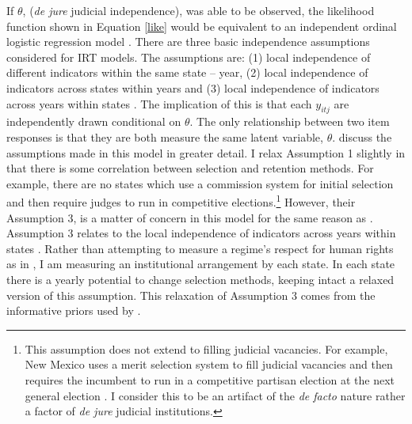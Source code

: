 \documentclass[12pt]{article}
\begin{document}
If $\theta$, (\textit{de jure} judicial independence), was able to be observed, the likelihood function shown in Equation \ref{like} would be equivalent to an independent ordinal logistic regression model \citep[8]{Schnakenberg2014}.  There are three basic independence assumptions considered for IRT models.  The assumptions are: (1) local independence of different indicators within the same state -- year, (2) local independence of indicators across states within years and (3) local independence of indicators across years within states \citep[8]{Schnakenberg2014}.  The implication of this is that each $y_{itj}$ are independently drawn conditional on $\theta$.  The only relationship between two item responses is that they are both measure the same latent variable, $\theta$. \citet[8]{Schnakenberg2014} discuss the assumptions made in this model in greater detail.  I relax Assumption 1 slightly in that there is some correlation between selection and retention methods. For example, there are no states which use a commission system for initial selection and then require judges to run in competitive elections.\footnote{This assumption does not extend to filling judicial vacancies.  For example, New Mexico uses a merit selection system to fill judicial vacancies and then requires the incumbent to run in a competitive partisan election at the next general election \citep{AJS}.  I consider this to be an artifact of the \textit{de facto} nature rather a factor of \textit{de jure} judicial institutions.}  However, their Assumption 3, is a matter of concern in this model for the same reason as \citet{Schnakenberg2014}.  Assumption 3 relates to the local independence of indicators across years within states \citep[8]{Schnakenberg2014}.  Rather than attempting to measure a regime's respect for human rights as in \citet{Schnakenberg2014}, I am measuring an institutional arrangement by each state.  In each state there is a yearly potential to change selection methods, keeping intact a relaxed version of this assumption.  This relaxation of Assumption 3 comes from the informative priors used by \citet[8]{Schnakenberg2014}.    
\end{document}
